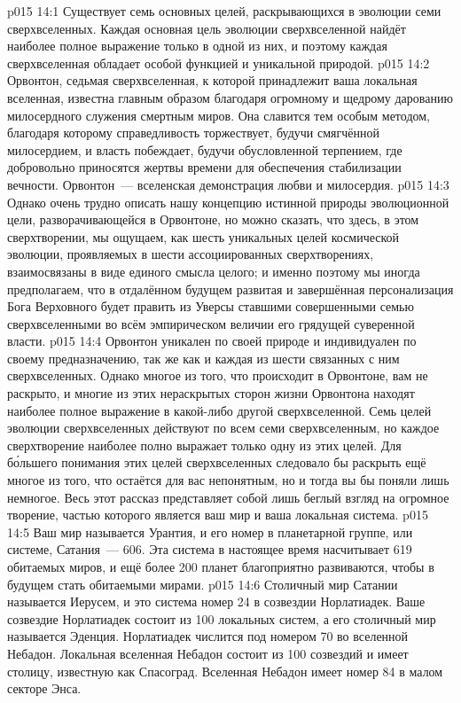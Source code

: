 \vs p015 14:1 Существует семь основных целей, раскрывающихся в эволюции семи сверхвселенных. Каждая основная цель эволюции сверхвселенной найдёт наиболее полное выражение только в одной из них, и поэтому каждая сверхвселенная обладает особой функцией и уникальной природой.
\vs p015 14:2 Орвонтон, седьмая сверхвселенная, к которой принадлежит ваша локальная вселенная, известна главным образом благодаря огромному и щедрому дарованию милосердного служения смертным миров. Она славится тем особым методом, благодаря которому справедливость торжествует, будучи смягчённой милосердием, и власть побеждает, будучи обусловленной терпением, где добровольно приносятся жертвы времени для обеспечения стабилизации вечности. Орвонтон~--- вселенская демонстрация любви и милосердия.
\vs p015 14:3 Однако очень трудно описать нашу концепцию истинной природы эволюционной цели, разворачивающейся в Орвонтоне, но можно сказать, что здесь, в этом сверхтворении, мы ощущаем, как шесть уникальных целей космической эволюции, проявляемых в шести ассоциированных сверхтворениях, взаимосвязаны в виде единого смысла целого; и именно поэтому мы иногда предполагаем, что в отдалённом будущем развитая и завершённая персонализация Бога Верховного будет править из Уверсы ставшими совершенными семью сверхвселенными во всём эмпирическом величии его грядущей суверенной власти.
\vs p015 14:4 Орвонтон уникален по своей природе и индивидуален по своему предназначению, так же как и каждая из шести связанных с ним сверхвселенных. Однако многое из того, что происходит в Орвонтоне, вам не раскрыто, и многие из этих нераскрытых сторон жизни Орвонтона находят наиболее полное выражение в какой\hyp{}либо другой сверхвселенной. Семь целей эволюции сверхвселенных действуют по всем семи сверхвселенным, но каждое сверхтворение наиболее полно выражает только одну из этих целей. Для б\'ольшего понимания этих целей сверхвселенных следовало бы раскрыть ещё многое из того, что остаётся для вас непонятным, но и тогда вы бы поняли лишь немногое. Весь этот рассказ представляет собой лишь беглый взгляд на огромное творение, частью которого является ваш мир и ваша локальная система.
\vs p015 14:5 \pc Ваш мир называется Урантия, и его номер в планетарной группе, или системе, Сатания~--- 606. Эта система в настоящее время насчитывает 619 обитаемых миров, и ещё более 200 планет благоприятно развиваются, чтобы в будущем стать обитаемыми мирами.
\vs p015 14:6 Столичный мир Сатании называется Иерусем, и это система номер 24 в созвездии Норлатиадек. Ваше созвездие Норлатиадек состоит из 100 локальных систем, а его столичный мир называется Эденция. Норлатиадек числится под номером 70 во вселенной Небадон. Локальная вселенная Небадон состоит из 100 созвездий и имеет столицу, известную как Спасоград. Вселенная Небадон имеет номер 84 в малом секторе Энса.
